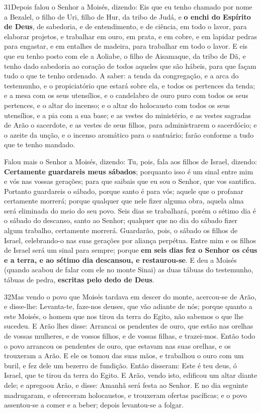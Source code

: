 \medskip

\lettrine{31} Depois falou o Senhor a Moisés, dizendo: Eis
que eu tenho chamado por nome a Bezalel, o filho de Uri, filho de
Hur, da tribo de Judá, e \textbf{o enchi do Espírito de Deus},
de sabedoria, e de entendimento, e de ciência, em todo o lavor,
para elaborar projetos, e trabalhar em ouro, em prata, e em
cobre, e em lapidar pedras para engastar, e em entalhes de
madeira, para trabalhar em todo o lavor. E eis que eu tenho
posto com ele a Aoliabe, o filho de Aisamaque, da tribo de Dã, e
tenho dado sabedoria ao coração de todos aqueles que são hábeis,
para que façam tudo o que te tenho ordenado. A saber: a tenda da
congregação, e a arca do testemunho, e o propiciatório que estará
sobre ela, e todos os pertences da tenda; e a mesa com os seus
utensílios, e o candelabro de ouro puro com todos os seus pertences,
e o altar do incenso; e o altar do holocausto com todos os seus
utensílios, e a pia com a sua base; e as vestes do
ministério, e as vestes sagradas de Arão o sacerdote, e as vestes de
seus filhos, para administrarem o sacerdócio; e o azeite da
unção, e o incenso aromático para o santuário; farão conforme a tudo
que te tenho mandado.

Falou mais o Senhor a Moisés, dizendo: Tu, pois, fala aos
filhos de Israel, dizendo: \textbf{Certamente guardareis meus
sábados}; porquanto isso é um sinal entre mim e vós nas vossas
gerações; para que saibais que eu sou o Senhor, que vos santifica.
Portanto guardareis o sábado, porque santo é para vós; aquele
que o profanar certamente morrerá; porque qualquer que nele fizer
alguma obra, aquela alma será eliminada do meio do seu povo.
Seis dias se trabalhará, porém o sétimo dia é o sábado do
descanso, santo ao Senhor; qualquer que no dia do sábado fizer algum
trabalho, certamente morrerá. Guardarão, pois, o sábado os
filhos de Israel, celebrando-o nas suas gerações por aliança
perpétua. Entre mim e os filhos de Israel será um sinal para
sempre; porque \textbf{em seis dias fez o Senhor os céus e a terra,
e ao sétimo dia descansou, e restaurou-se}. E deu a Moisés
(quando acabou de falar com ele no monte Sinai) as duas tábuas do
testemunho, tábuas de pedra, \textbf{escritas pelo dedo de Deus}.

\medskip

\lettrine{32} Mas vendo o povo que Moisés tardava em descer do
monte, acercou-se de Arão, e disse-lhe: Levanta-te, faze-nos deuses,
que vão adiante de nós; porque quanto a este Moisés, o homem que nos
tirou da terra do Egito, não sabemos o que lhe sucedeu. E Arão
lhes disse: Arrancai os pendentes de ouro, que estão nas orelhas de
vossas mulheres, e de vossos filhos, e de vossas filhas, e
trazei-mos. Então todo o povo arrancou os pendentes de ouro, que
estavam nas suas orelhas, e os trouxeram a Arão. E ele os tomou
das suas mãos, e trabalhou o ouro com um buril, e fez dele um
bezerro de fundição. Então disseram: Este é teu deus, ó Israel, que
te tirou da terra do Egito. E Arão, vendo isto, edificou um
altar diante dele; e apregoou Arão, e disse: Amanhã será festa ao
Senhor. E no dia seguinte madrugaram, e ofereceram holocaustos,
e trouxeram ofertas pacíficas; e o povo assentou-se a comer e a
beber; depois levantou-se a folgar.

